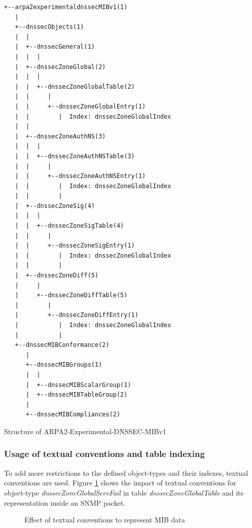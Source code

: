 \begin{listing}
\small\begin{verbatim}
+--arpa2experimentaldnssecMIBv1(1)
   |
   +--dnssecObjects(1)
   |  |
   |  +--dnssecGeneral(1)
   |  |  |
   |  +--dnssecZoneGlobal(2)
   |  |  |
   |  |  +--dnssecZoneGlobalTable(2)
   |  |     |
   |  |     +--dnssecZoneGlobalEntry(1)
   |  |        |  Index: dnssecZoneGlobalIndex
   |  |
   |  +--dnssecZoneAuthNS(3)
   |  |  |
   |  |  +--dnssecZoneAuthNSTable(3)
   |  |     |
   |  |     +--dnssecZoneAuthNSEntry(1)
   |  |        |  Index: dnssecZoneGlobalIndex
   |  |        |
   |  +--dnssecZoneSig(4)
   |  |  |
   |  |  +--dnssecZoneSigTable(4)
   |  |     |
   |  |     +--dnssecZoneSigEntry(1)
   |  |        |  Index: dnssecZoneGlobalIndex
   |  |        |
   |  +--dnssecZoneDiff(5)
   |     |
   |     +--dnssecZoneDiffTable(5)
   |        |
   |        +--dnssecZoneDiffEntry(1)
   |           |  Index: dnssecZoneGlobalIndex
   |           |
   +--dnssecMIBConformance(2)
      |
      +--dnssecMIBGroups(1)
      |  |
      |  +--dnssecMIBScalarGroup(1)
      |  +--dnssecMIBTableGroup(2)
      |
      +--dnssecMIBCompliances(2)

\end{verbatim}
\normalsize
\caption{Structure of ARPA2-Experimental-DNSSEC-MIBv1}
\label{listing:snmptranslate}
\end{listing}

\subsubsection{Usage of textual conventions and table indexing}

To add more restrictions to the defined object-types and their indexes, textual conventions are used. Figure \ref{figure:textual-conventions} shows the impact of textual conventions for object-type \textit{dnssecZoneGlobalServFail} in table \textit{dnssecZoneGlobalTable} and its representation inside an SNMP packet.    


\begin{figure}[htp] 
\caption{Effect of textual conventions to represent MIB data}
\label{figure:textual-conventions}
\end{figure}


